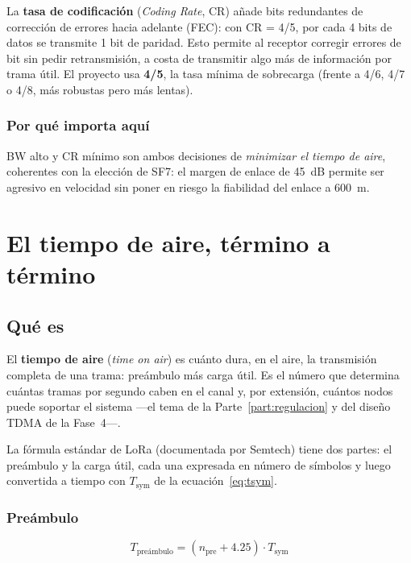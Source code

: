 La \textbf{tasa de codificación} (\emph{Coding Rate}, CR) añade bits redundantes de corrección
de errores hacia adelante (FEC): con CR = 4/5, por cada 4 bits de datos se transmite 1 bit de
paridad. Esto permite al receptor corregir errores de bit sin pedir retransmisión, a costa de
transmitir algo más de información por trama útil. El proyecto usa \textbf{4/5}, la tasa mínima
de sobrecarga (frente a 4/6, 4/7 o 4/8, más robustas pero más lentas).

\subsection*{Por qué importa aquí}

BW alto y CR mínimo son ambos decisiones de \emph{minimizar el tiempo de aire}, coherentes con
la elección de SF7: el margen de enlace de \SI{45}{dB} permite ser agresivo en velocidad sin
poner en riesgo la fiabilidad del enlace a \SI{600}{m}.

\chapter{El tiempo de aire, término a término}
\label{sec:airtime}

\section{Qué es}

El \textbf{tiempo de aire} (\emph{time on air}) es cuánto dura, en el aire, la transmisión
completa de una trama: preámbulo más carga útil. Es el número que determina cuántas tramas por
segundo caben en el canal y, por extensión, cuántos nodos puede soportar el sistema —el tema de
la Parte~\ref{part:regulacion} y del diseño TDMA de la Fase~4—.

La fórmula estándar de LoRa (documentada por Semtech) tiene dos partes: el preámbulo y la carga
útil, cada una expresada en número de símbolos y luego convertida a tiempo con $T_{\text{sym}}$
de la ecuación~\eqref{eq:tsym}.

\subsection*{Preámbulo}

\begin{equation}
  T_{\text{preámbulo}} = (n_{\text{pre}} + 4.25) \cdot T_{\text{sym}}
  \label{eq:tpre}
\end{equation}

